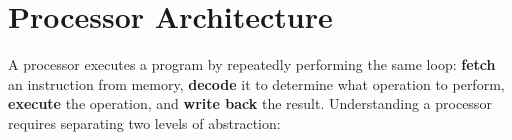 \documentclass[9pt, a4paper]{extarticle}
\begin{document}

\section{Processor Architecture}

A processor executes a program by repeatedly performing the same loop: \textbf{fetch} an instruction from memory, \textbf{decode} it to determine what operation to perform, \textbf{execute} the operation, and \textbf{write back} the result. Understanding a processor requires separating two levels of abstraction:
\end{document}
